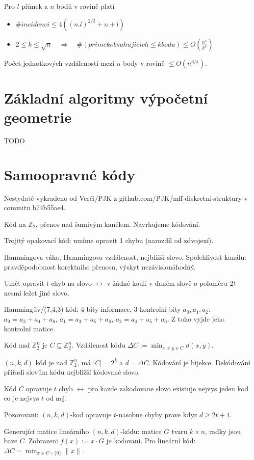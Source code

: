 \documentclass[a4paper,10pt,titlepage]{article} \usepackage[utf8]{inputenc}
\def\Z{\mathbb{Z}}
\begin{document}
\noindent Pro $l$ přímek a $n$ bodů v rovině platí
\begin{itemize}
\item $\#incidenci \leq 4((n.l)^{2/3} + n + l)$
\item $2 \leq k \leq \sqrt{n} \quad \Rightarrow \quad \#(primek obsahujicich \leq k bodu) \leq O(\frac{n^2}{k^3})$
\end{itemize}

\noindent Počet jednotkových vzdáleností mezi $n$ body v rovině $\leq O(n^{3/4}).$

\section{Základní algoritmy výpočetní geometrie}
TODO

\def\vykradeno{Nestydatě vykradeno od Verči/PJK z
github.com/PJK/mff-diskretni-struktury v commitu b74b55ae4.}

\section{Samoopravné kódy}
\vykradeno

Kód na $\Z_2$, přenos nad šumivým kanélem. Navrhujeme kódování.

Trojitý opakovací kód: umíme opravit 1 chybu (narozdíl od zdvojení).

Hammingova váha, Hammingova vzdálenost, nejbližší slovo. Spolehlivost kanálu:
pravděpodobnost korektního přenosu, výskyt nezávislonáhodný.

Umět opravit $t$ chyb na slovo $\leftrightarrow$ v žádné kouli v daném slově o
poloměru $2t$ nesmí ležet jiné slovo.

Hammingův/(7,4,3) kód: 4 bity informace, 3 kontrolní bity $a_0, a_1, a_2$:
$a_0=a_3+a_4+a_6$, $a_1=a_3+a_5+a_6$, $a_2=a_4+a_5+a_6$. Z toho vyjde jeho
kontrolní matice.

Kód nad $\Z_2^n$ je $C\subseteq\Z_2^n$. Vzdálenost kódu $\Delta C:=\min_{x\neq
y\in C} d(x,y)$.

$(n,k,d)$ kód je nad $\Z_2^n$, má $|C|=2^k$ a $d=\Delta C$.
Kódování je bijekce. Dekódování přiřadí slovům kódu nejbližší kódované slovo.

Kód $C$ opravuje $t$ chyb $\leftrightarrow$ pro kazde zakodovane slovo
existuje nejvys jeden kod co je nejvys $t$ od nej.

Pozorovani: $(n,k,d)$-kod opravuje $t$-nasobne chyby prave kdyz $d\geq 2t+1$.

Generující matice lineárního $(n,k,d)$-kódu: matice $G$ tvaru $k\times n$,
radky jsou baze $C$. Zobrazeni $f(x):=x\cdot G$ je kodovani.
Pro lineární kód: $\Delta C=\min_{x\in C\smallsetminus\{0\}}\|x\|$.
\end{document}
